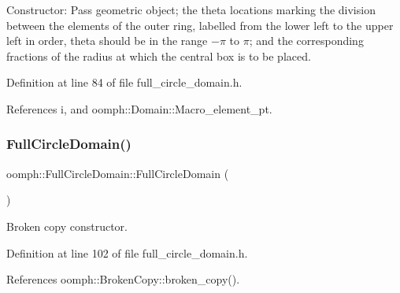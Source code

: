 Constructor\+: Pass geometric object; the theta locations marking the division between the elements of the outer ring, labelled from the lower left to the upper left in order, theta should be in the range $-\pi$ to $\pi$; and the corresponding fractions of the radius at which the central box is to be placed. 



Definition at line 84 of file full\+\_\+circle\+\_\+domain.\+h.



References i, and oomph\+::\+Domain\+::\+Macro\+\_\+element\+\_\+pt.

\mbox{\label{classoomph_1_1FullCircleDomain_a36c2bdc01a19f511c97a89f87cd5b7dc}} 
\subsubsection{\texorpdfstring{Full\+Circle\+Domain()}{FullCircleDomain()}\hspace{0.1cm}{\footnotesize\ttfamily [2/2]}}
{\footnotesize\ttfamily oomph\+::\+Full\+Circle\+Domain\+::\+Full\+Circle\+Domain (\begin{DoxyParamCaption}\item[{const \hyperlink{classoomph_1_1FullCircleDomain}{Full\+Circle\+Domain} \&}]{ }\end{DoxyParamCaption})\hspace{0.3cm}{\ttfamily [inline]}}



Broken copy constructor. 



Definition at line 102 of file full\+\_\+circle\+\_\+domain.\+h.



References oomph\+::\+Broken\+Copy\+::broken\+\_\+copy().

\mbox{\label{classoomph_1_1FullCircleDomain_afbdae044de6d958491a0b1a8cfcbc175}} 
